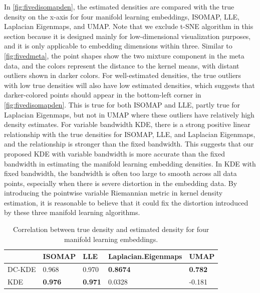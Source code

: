 \documentclass[11pt,a4paper,]{article}
\begin{document}
In \autoref{fig:fivedisomapden}, the estimated densities are compared with the true density on the x-axis for four manifold learning embeddings, ISOMAP, LLE, Laplacian Eigenmaps, and UMAP. Note that we exclude t-SNE algorithm in this section because it is designed mainly for low-dimensional visualization purposes, and it is only applicable to embedding dimensions within three. Similar to \autoref{fig:fivedmeta}, the point shapes show the two mixture component in the meta data, and the colors represent the distance to the kernel means, with distant outliers shown in darker colors. For well-estimated densities, the true
outliers with low true densities will also have low estimated densities, which suggests that darker-colored points should appear in the bottom-left corner in \autoref{fig:fivedisomapden}. This is true for both ISOMAP and LLE, partly true for Laplacian Eigenmaps, but not in UMAP where these outliers have relatively high density estimates. For variable bandwidth KDE, there is a strong positive linear relationship with the true densities for ISOMAP, LLE, and Laplacian Eigenmaps, and
the relationship is stronger than the fixed bandwidth. This suggests that our proposed KDE with variable bandwidth is more accurate than the fixed bandwidth in estimating the manifold learning embedding densities.
In KDE with fixed bandwidth, the bandwidth is often too large to smooth across all data points, especially when there is severe distortion in the embedding data. By introducing the pointwise variable Riemannian metric in kernel density estimation, it is reasonable to believe that it could fix the distortion introduced by these three manifold learning algorithms.

\begin{table}

\caption{\label{tab:fivedcors}Correlation between true density and estimated density for four manifold learning embeddings.}
\centering
\begin{tabular}[t]{l>{}l>{}l>{}l>{}l}
\toprule
  & ISOMAP & LLE & Laplacian.Eigenmaps & UMAP\\
\midrule
DC-KDE & 0.968 & 0.970 & \textbf{0.8674} & \textbf{0.782}\\
KDE & \textbf{0.976} & \textbf{0.971} & 0.0328 & -0.181\\
\bottomrule
\end{tabular}
\end{table}
\end{document}
